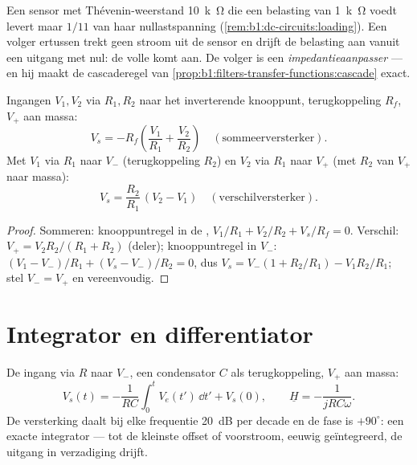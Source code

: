 \begin{example}\label{ex:b1:operational-amplifier:follower}
Een sensor met Thévenin-weerstand \qty{10}{k\ohm} die een belasting van \qty{1}{k\ohm}
voedt levert maar $1/11$ van haar nullastspanning
(\cref{rem:b1:dc-circuits:loading}). Een volger ertussen trekt geen
stroom uit de sensor en drijft de belasting aan vanuit een uitgang met 
nul: de volle  komt aan. De volger is een \emph{impedantieaanpasser}
--- en hij maakt de cascaderegel van
\cref{prop:b1:filters-transfer-functions:cascade} exact.
\end{example}

\begin{proposition}\label{prop:b1:operational-amplifier:sumdiff}
Ingangen $V_1, V_2$ via $R_1, R_2$ naar het inverterende knooppunt, terugkoppeling
$R_f$, $V_+$ aan massa:
\[
V_s = -R_f\left(\frac{V_1}{R_1} + \frac{V_2}{R_2}\right)
\quad (\text{sommeerversterker}).
\]
Met $V_1$ via $R_1$ naar $V_-$ (terugkoppeling $R_2$) en $V_2$ via
$R_1$ naar $V_+$ (met $R_2$ van $V_+$ naar massa):
\[
V_s = \frac{R_2}{R_1}\,(V_2 - V_1)
\quad (\text{verschilversterker}).
\]
\end{proposition}

\begin{proof}
Sommeren: knooppuntregel in de , $V_1/R_1 + V_2/R_2 + V_s/R_f =
0$. Verschil: $V_+ = V_2R_2/(R_1 + R_2)$ (deler); knooppuntregel in $V_-$:
$(V_1 - V_-)/R_1 + (V_s - V_-)/R_2 = 0$, dus $V_s = V_-(1 + R_2/R_1) -
V_1R_2/R_1$; stel $V_- = V_+$ en vereenvoudig.
\end{proof}

\section{Integrator en differentiator}

\begin{proposition}[Integrator]\label{prop:b1:operational-amplifier:integrator}
De ingang via $R$ naar $V_-$, een condensator $C$ als terugkoppeling, $V_+$
aan massa:
\[
V_s(t) = -\frac{1}{RC}\int_0^t V_e(t')\,\dd t' + V_s(0),
\qquad
\underline H = -\frac{1}{jRC\omega} .
\]
De versterking daalt bij elke frequentie \qty{20}{dB} per decade en de fase
is $+90^\circ$: een exacte integrator --- tot de kleinste offset of
voorstroom, eeuwig geïntegreerd, de uitgang in verzadiging drijft.
\end{proposition}

